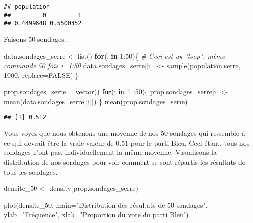 \documentclass[
]{book}
\newenvironment{Shaded}{\begin{snugshade}}{\end{snugshade}}
\newcommand{\AttributeTok}[1]{\textcolor[rgb]{0.77,0.63,0.00}{#1}}
\newcommand{\CommentTok}[1]{\textcolor[rgb]{0.56,0.35,0.01}{\textit{#1}}}
\newcommand{\ConstantTok}[1]{\textcolor[rgb]{0.00,0.00,0.00}{#1}}
\newcommand{\ControlFlowTok}[1]{\textcolor[rgb]{0.13,0.29,0.53}{\textbf{#1}}}
\newcommand{\DecValTok}[1]{\textcolor[rgb]{0.00,0.00,0.81}{#1}}
\newcommand{\FunctionTok}[1]{\textcolor[rgb]{0.00,0.00,0.00}{#1}}
\newcommand{\NormalTok}[1]{#1}
\newcommand{\OtherTok}[1]{\textcolor[rgb]{0.56,0.35,0.01}{#1}}
\newcommand{\SpecialCharTok}[1]{\textcolor[rgb]{0.00,0.00,0.00}{#1}}
\newcommand{\StringTok}[1]{\textcolor[rgb]{0.31,0.60,0.02}{#1}}
\begin{document}
\begin{verbatim}
## population
##         0         1 
## 0.4499648 0.5500352
\end{verbatim}

Faisons 50 sondages.

\begin{Shaded}
\begin{Highlighting}[]
\NormalTok{data.sondages\_serre }\OtherTok{\textless{}{-}} \FunctionTok{list}\NormalTok{()}
\ControlFlowTok{for}\NormalTok{(i }\ControlFlowTok{in} \DecValTok{1}\SpecialCharTok{:}\DecValTok{50}\NormalTok{)\{ }\CommentTok{\# Ceci est un "loop", même commande 50 fois i=1:50}
\NormalTok{    data.sondages\_serre[[i]] }\OtherTok{\textless{}{-}} \FunctionTok{sample}\NormalTok{(population.serre, }\DecValTok{1000}\NormalTok{, }\AttributeTok{replace=}\ConstantTok{FALSE}\NormalTok{)}
\NormalTok{\}}

\NormalTok{prop.sondages\_serre }\OtherTok{=} \FunctionTok{vector}\NormalTok{()}
\ControlFlowTok{for}\NormalTok{(i }\ControlFlowTok{in} \DecValTok{1} \SpecialCharTok{:}\DecValTok{50}\NormalTok{)\{}
\NormalTok{    prop.sondages\_serre[i] }\OtherTok{\textless{}{-}} \FunctionTok{mean}\NormalTok{(data.sondages\_serre[[i]])}
\NormalTok{\}}
\FunctionTok{mean}\NormalTok{(prop.sondages\_serre)}
\end{Highlighting}
\end{Shaded}

\begin{verbatim}
## [1] 0.512
\end{verbatim}

Vous voyez que nous obtenons une moyenne de nos 50 sondages qui ressemble à ce qui devrait être la vraie valeur de 0.51 pour le parti Bleu. Ceci étant, tous nos sondages n'ont pas, individuellement la même moyenne. Visualisons la distribution de nos sondages pour voir comment se sont répartis les résultats de tous les sondages.

\begin{Shaded}
\begin{Highlighting}[]
\NormalTok{densite\_50 }\OtherTok{\textless{}{-}} \FunctionTok{density}\NormalTok{(prop.sondages\_serre)}

\FunctionTok{plot}\NormalTok{(densite\_50, }
     \AttributeTok{main=}\StringTok{"Distribution des résultats de 50 sondages"}\NormalTok{,}
     \AttributeTok{ylab=}\StringTok{"Fréquence"}\NormalTok{,}
     \AttributeTok{xlab=}\StringTok{"Proportion du vote du parti Bleu"}\NormalTok{)}
\end{Highlighting}
\end{Shaded}
\end{document}
